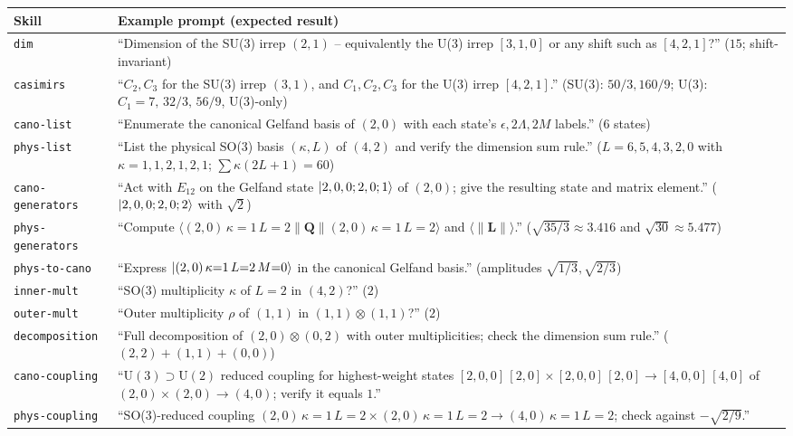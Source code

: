 \documentclass[aps,onecolumn,10pt,superscriptaddress,floatfix,nofootinbib]{revtex4}
\begin{document}
\begin{table}[tp]
    \centering
    \small
    \begin{tabular}{p{3.1cm}p{13.2cm}}
    \hline\hline
    Skill & Example prompt (expected result) \\
    \hline
    \verb|dim| & ``Dimension of the SU(3) irrep $(2,1)$ -- equivalently the U(3) irrep $[3,1,0]$ or any shift such as $[4,2,1]$?'' ($15$; shift-invariant) \\
    \verb|casimirs| & ``$C_2,C_3$ for the SU(3) irrep $(3,1)$, and $C_1,C_2,C_3$ for the U(3) irrep $[4,2,1]$.'' (SU(3): $50/3,160/9$; U(3): $C_1{=}7,\,32/3,\,56/9$, U(3)-only) \\
    \verb|cano-list| & ``Enumerate the canonical Gelfand basis of $(2,0)$ with each state's $\epsilon,2\Lambda,2M$ labels.'' ($6$ states) \\
    \verb|phys-list| & ``List the physical SO(3) basis $(\kappa,L)$ of $(4,2)$ and verify the dimension sum rule.'' ($L{=}6,5,4,3,2,0$ with $\kappa{=}1,1,2,1,2,1$; $\sum\kappa(2L{+}1){=}60$) \\
    \verb|cano-generators| & ``Act with $E_{12}$ on the Gelfand state $\ket{2,0,0;2,0;1}$ of $(2,0)$; give the resulting state and matrix element.'' ($\ket{2,0,0;2,0;2}$ with $\sqrt2$) \\
    \verb|phys-generators| & ``Compute $\langle(2,0)\,\kappa{=}1\,L{=}2\|\mathbf{Q}\|(2,0)\,\kappa{=}1\,L{=}2\rangle$ and $\langle\|\mathbf{L}\|\rangle$.'' ($\sqrt{35/3}\approx3.416$ and $\sqrt{30}\approx5.477$) \\
    \verb|phys-to-cano| & ``Express $\ket{(2,0)\,\kappa{=}1\,L{=}2\,M{=}0}$ in the canonical Gelfand basis.'' (amplitudes $\sqrt{1/3},\sqrt{2/3}$) \\
    \verb|inner-mult| & ``SO(3) multiplicity $\kappa$ of $L{=}2$ in $(4,2)$?'' ($2$) \\
    \verb|outer-mult| & ``Outer multiplicity $\rho$ of $(1,1)$ in $(1,1)\otimes(1,1)$?'' ($2$) \\
    \verb|decomposition| & ``Full decomposition of $(2,0)\otimes(0,2)$ with outer multiplicities; check the dimension sum rule.'' ($(2,2){+}(1,1){+}(0,0)$) \\
    \verb|cano-coupling| & ``$\mathrm{U(3)}{\supset}\mathrm{U(2)}$ reduced coupling for highest-weight states $[2,0,0]\,[2,0]\times[2,0,0]\,[2,0]\to[4,0,0]\,[4,0]$ of $(2,0)\times(2,0)\to(4,0)$; verify it equals $1$.'' \\
    \verb|phys-coupling| & ``SO(3)-reduced coupling $(2,0)\,\kappa{=}1\,L{=}2\times(2,0)\,\kappa{=}1\,L{=}2\to(4,0)\,\kappa{=}1\,L{=}2$; check against $-\sqrt{2/9}$.'' \\

\end{tabular}
\end{table}
\end{document}
